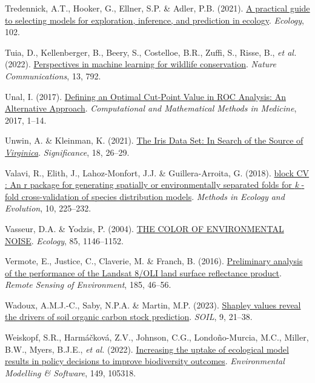 \documentclass[
  letterpaper,
]{scrbook}
\newlength{\cslhangindent}
\newenvironment{CSLReferences}[2] %
 {\begin{list}{}{%
  \setlength{\itemindent}{0pt}
  \setlength{\leftmargin}{0pt}
  \setlength{\parsep}{0pt}
  \ifodd #1
   \setlength{\leftmargin}{\cslhangindent}
   \setlength{\itemindent}{-1\cslhangindent}
  \fi
  \setlength{\itemsep}{#2\baselineskip}}}
 {\end{list}}
\begin{document}
\begin{CSLReferences}{1}{0}
Tredennick, A.T., Hooker, G., Ellner, S.P. \& Adler, P.B. (2021).
\href{https://doi.org/10.1002/ecy.3336}{A practical guide to selecting
models for exploration, inference, and prediction in ecology}.
\emph{Ecology}, 102.

Tuia, D., Kellenberger, B., Beery, S., Costelloe, B.R., Zuffi, S.,
Risse, B., \emph{et al.} (2022).
\href{https://doi.org/10.1038/s41467-022-27980-y}{Perspectives in
machine learning for wildlife conservation}. \emph{Nature
Communications}, 13, 792.

Unal, I. (2017). \href{https://doi.org/10.1155/2017/3762651}{Defining an
Optimal Cut-Point Value in ROC Analysis: An Alternative Approach}.
\emph{Computational and Mathematical Methods in Medicine}, 2017, 1--14.

Unwin, A. \& Kleinman, K. (2021).
\href{https://doi.org/10.1111/1740-9713.01589}{The Iris Data Set: In
Search of the Source of {\emph{Virginica}}}. \emph{Significance}, 18,
26--29.

Valavi, R., Elith, J., Lahoz-Monfort, J.J. \& Guillera-Arroita, G.
(2018). \href{https://doi.org/10.1111/2041-210x.13107}{block CV : An r
package for generating spatially or environmentally separated folds for
{\emph{k}} {-}fold cross{-}validation of species distribution models}.
\emph{Methods in Ecology and Evolution}, 10, 225--232.

Vasseur, D.A. \& Yodzis, P. (2004).
\href{https://doi.org/10.1890/02-3122}{THE COLOR OF ENVIRONMENTAL
NOISE}. \emph{Ecology}, 85, 1146--1152.

Vermote, E., Justice, C., Claverie, M. \& Franch, B. (2016).
\href{https://doi.org/10.1016/j.rse.2016.04.008}{Preliminary analysis of
the performance of the Landsat 8/OLI land surface reflectance product}.
\emph{Remote Sensing of Environment}, 185, 46--56.

Wadoux, A.M.J.-C., Saby, N.P.A. \& Martin, M.P. (2023).
\href{https://doi.org/10.5194/soil-9-21-2023}{Shapley values reveal the
drivers of soil organic carbon stock prediction}. \emph{SOIL}, 9,
21--38.

Weiskopf, S.R., Harmáčková, Z.V., Johnson, C.G., Londoño-Murcia, M.C.,
Miller, B.W., Myers, B.J.E., \emph{et al.} (2022).
\href{https://doi.org/10.1016/j.envsoft.2022.105318}{Increasing the
uptake of ecological model results in policy decisions to improve
biodiversity outcomes}. \emph{Environmental Modelling \& Software}, 149,
105318.


\end{CSLReferences}
\end{document}
